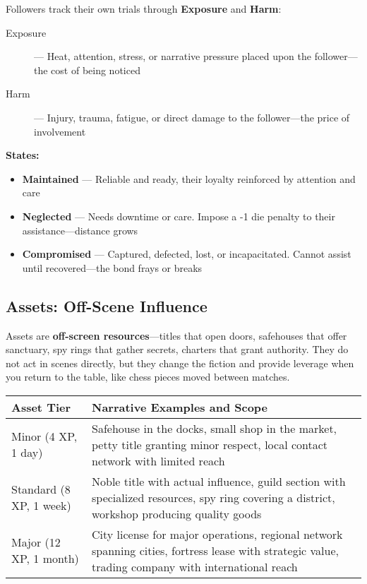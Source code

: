 Followers track their own trials through \textbf{Exposure} and \textbf{Harm}:

\begin{description}
    \item[Exposure] --- Heat, attention, stress, or narrative pressure placed upon the follower—the cost of being noticed
    \item[Harm] --- Injury, trauma, fatigue, or direct damage to the follower—the price of involvement
\end{description}

\textbf{States:}
\begin{itemize}
    \item \textbf{Maintained} --- Reliable and ready, their loyalty reinforced by attention and care
    \item \textbf{Neglected} --- Needs downtime or care. Impose a -1 die penalty to their assistance—distance grows
    \item \textbf{Compromised} --- Captured, defected, lost, or incapacitated. Cannot assist until recovered—the bond frays or breaks
\end{itemize}

\subsection*{Assets: Off-Scene Influence}

Assets are \textbf{off-screen resources}---titles that open doors, safehouses that offer sanctuary, spy rings that gather secrets, charters that grant authority. They do not act in scenes directly, but they change the fiction and provide leverage when you return to the table, like chess pieces moved between matches.

\begin{fatebox}
\begin{tabularx}{\textwidth}{lX}
\toprule
\textbf{Asset Tier} & \textbf{Narrative Examples and Scope} \\
\midrule
Minor (4 XP, 1 day) & Safehouse in the docks, small shop in the market, petty title granting minor respect, local contact network with limited reach \\
Standard (8 XP, 1 week) & Noble title with actual influence, guild section with specialized resources, spy ring covering a district, workshop producing quality goods \\
Major (12 XP, 1 month) & City license for major operations, regional network spanning cities, fortress lease with strategic value, trading company with international reach \\
\bottomrule
\end{tabularx}
\end{fatebox}

